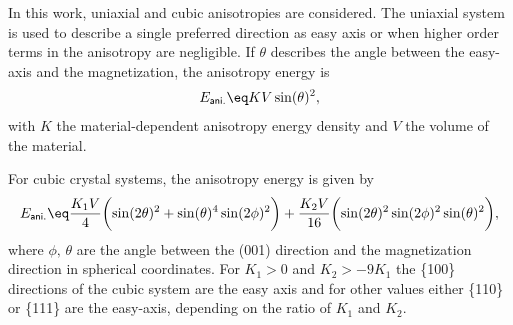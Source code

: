 \documentclass[\main/dresen_thesis.tex]{subfiles}
\begin{document}
      In this work, uniaxial and cubic anisotropies are considered.
      The uniaxial system is used to describe a single preferred direction as easy axis or when higher order terms in the anisotropy are negligible.
      If $\theta$ describes the angle between the easy-axis and the magnetization, the anisotropy energy is
      \begin{align}
        E_\mathsf{ani.} \eq K V \sin(\theta)^2,
      \end{align}
      with $K$ the material-dependent anisotropy energy density and $V$ the volume of the material.

      For cubic crystal systems, the anisotropy energy is given by
      \begin{align}
        E_\mathsf{ani.} \eq
          \frac{K_1 V}{4} \biggl(\sin(2 \theta)^2 + \sin(\theta)^4 \sin(2\phi)^2 \biggr) +
          \frac{K_2 V}{16} \biggl( \sin(2 \theta)^2 \sin(2 \phi)^2 \sin(\theta)^2 \biggr),
      \end{align}
      where $\phi, \, \theta$ are the angle between the (001) direction and the magnetization direction in spherical coordinates.
      For $K_1 > 0$ and $K_2 > -9 K_1$ the \{100\} directions of the cubic system are the easy axis and for other values either \{110\} or \{111\} are the easy-axis, depending on the ratio of $K_1$ and $K_2$.
\end{document}
